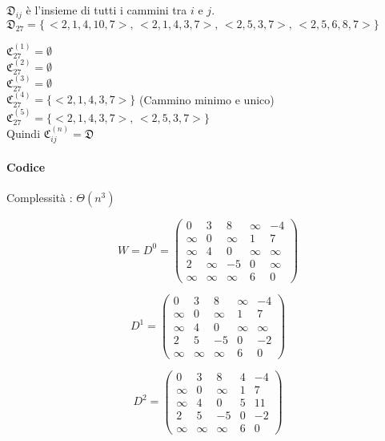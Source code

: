 

$\mathfrak{D}_{ij}$ è l'insieme di tutti i cammini tra $i$ e $j$. \\
$\mathfrak{D}_{27} = \{\,<2,1,4,10,7>,\,<2,1,4,3,7>,\, <2,5,3,7>,\, <2,5,6,8,7>\}$

$\mathfrak{C}_{27}^{(1)} = \emptyset$ \\
$\mathfrak{C}_{27}^{(2)} = \emptyset$ \\
$\mathfrak{C}_{27}^{(3)} = \emptyset$ \\
$\mathfrak{C}_{27}^{(4)} = \{<2,1,4,3,7>\}$ (Cammino minimo e unico)\\
$\mathfrak{C}_{27}^{(5)} = \{<2,1,4,3,7>,\, <2,5,3,7>\}$ \\
Quindi $\mathfrak{C}_{ij}^{(n)} = \mathfrak{D}$ \\


\paragraph{Codice}




Complessità : $\Theta(n^3)$


\[
W = D^0 =
 \begin{pmatrix}
  0 & 3 & 8 & \infty & -4 \\
  \infty & 0 & \infty & 1 & 7 \\
  \infty & 4 & 0 & \infty & \infty \\
  2 & \infty & -5 & 0 & \infty \\
  \infty & \infty & \infty & 6 & 0
 \end{pmatrix}
\]

\[
D^1 =
 \begin{pmatrix}
  0 & 3 & 8 & \infty & -4 \\
  \infty & 0 & \infty & 1 & 7 \\
  \infty & 4 & 0 & \infty & \infty \\
  2 & 5 & -5 & 0 & -2 \\
  \infty & \infty & \infty & 6 & 0
 \end{pmatrix}
\]

\[
D^2 =
 \begin{pmatrix}
  0 & 3 & 8 & 4 & -4 \\
  \infty & 0 & \infty & 1 & 7 \\
  \infty & 4 & 0 & 5 & 11 \\
  2 & 5 & -5 & 0 & -2 \\
  \infty & \infty & \infty & 6 & 0
 \end{pmatrix}
\]

